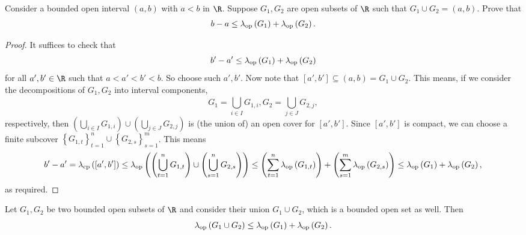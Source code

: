 \documentclass[pmath450]{subfiles}
\begin{document}
    \begin{exercise}{}
        Consider a bounded open interval $\left( a,b \right)$ with $a<b$ in $\R$. Suppose $G_1,G_2$ are open subsets of $\R$ such that $G_1\cup G_2=\left( a,b \right)$. Prove that
        \begin{equation*}
            b-a \leq \lambda_{\operatorname{op}}\left( G_1 \right)+\lambda_{\operatorname{op}}\left( G_2 \right).
        \end{equation*}
    \end{exercise}

    \begin{proof}
        It suffices to check that
        \begin{equation*}
            b'-a' \leq \lambda_{\operatorname{op}}\left( G_1 \right)+\lambda_{\operatorname{op}}\left( G_2 \right)
        \end{equation*}
        for all $a',b'\in\R$ such that $a<a'<b'<b$. So choose such $a',b'$. Now note that $\left[ a',b' \right]\subseteq\left( a,b \right)=G_1\cup G_2$. This means, if we consider the decompositions of $G_1,G_2$ into interval components,
        \begin{equation*}
            G_1 = \bigcup^{}_{i\in I}G_{1,i}, G_2 = \bigcup^{}_{j\in J}G_{2,j},
        \end{equation*}
        respectively, then $\left( \bigcup^{}_{i\in I}G_{1,i} \right)\cup\left( \bigcup^{}_{j\in J}G_{2,j} \right)$ is (the union of) an open cover for $\left[ a',b' \right]$. Since $\left[ a',b' \right]$ is compact, we can choose a finite subcover $\left\lbrace G_{1,t} \right\rbrace^{n}_{t=1}\cup\left\lbrace G_{2,s} \right\rbrace^{m}_{s=1}$. This means
        \begin{equation*}
            b'-a' = \lambda_{\operatorname{cp}}\left( \left[ a',b' \right] \right) \leq \lambda_{\operatorname{op}}\left( \left( \bigcup^{n}_{t=1}G_{1,t} \right)\cup\left( \bigcup^{n}_{s=1}G_{2,s} \right) \right) \leq \left( \sum^{n}_{t=1}\lambda_{\operatorname{op}}\left( G_{1,t} \right) \right) + \left( \sum^{m}_{s=1}\lambda_{\operatorname{op}}\left( G_{2,s} \right) \right) \leq \lambda_{\operatorname{op}}\left( G_1 \right)+\lambda_{\operatorname{op}}\left( G_2 \right),
        \end{equation*}
        as required.
    \end{proof}

    \begin{prop}{}
        Let $G_1,G_2$ be two bounded open subsets of $\R$ and consider their union $G_1\cup G_2$, which is a bounded open set as well. Then
        \begin{equation*}
            \lambda_{\operatorname{op}}\left( G_1\cup G_2 \right)\leq\lambda_{\operatorname{op}}\left( G_1 \right)+\lambda_{\operatorname{op}}\left( G_2 \right).
        \end{equation*}
    \end{prop}
\end{document}

